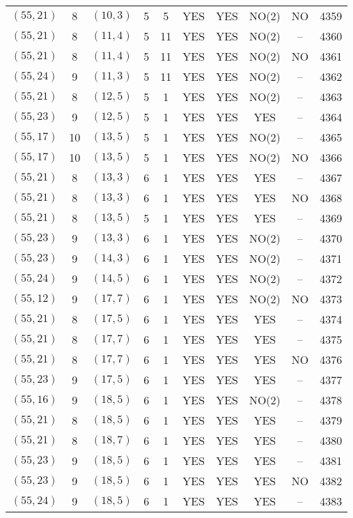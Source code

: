 \begin{longtable}{|c|c|c|c|c|c|c|c|c|c|}
$(55, 21)$ & 8 & $(10, 3)$ & 5 & 5 & YES & YES & NO(2) & NO & 4359\\
$(55, 21)$ & 8 & $(11, 4)$ & 5 & 11 & YES & YES & NO(2) & -- & 4360\\
$(55, 21)$ & 8 & $(11, 4)$ & 5 & 11 & YES & YES & NO(2) & NO & 4361\\
$(55, 24)$ & 9 & $(11, 3)$ & 5 & 11 & YES & YES & NO(2) & -- & 4362\\
$(55, 21)$ & 8 & $(12, 5)$ & 5 & 1 & YES & YES & NO(2) & -- & 4363\\
$(55, 23)$ & 9 & $(12, 5)$ & 5 & 1 & YES & YES & YES & -- & 4364\\
$(55, 17)$ & 10 & $(13, 5)$ & 5 & 1 & YES & YES & NO(2) & -- & 4365\\
$(55, 17)$ & 10 & $(13, 5)$ & 5 & 1 & YES & YES & NO(2) & NO & 4366\\
$(55, 21)$ & 8 & $(13, 3)$ & 6 & 1 & YES & YES & YES & -- & 4367\\
$(55, 21)$ & 8 & $(13, 3)$ & 6 & 1 & YES & YES & YES & NO & 4368\\
$(55, 21)$ & 8 & $(13, 5)$ & 5 & 1 & YES & YES & YES & -- & 4369\\
$(55, 23)$ & 9 & $(13, 3)$ & 6 & 1 & YES & YES & NO(2) & -- & 4370\\
$(55, 23)$ & 9 & $(14, 3)$ & 6 & 1 & YES & YES & NO(2) & -- & 4371\\
$(55, 24)$ & 9 & $(14, 5)$ & 6 & 1 & YES & YES & NO(2) & -- & 4372\\
$(55, 12)$ & 9 & $(17, 7)$ & 6 & 1 & YES & YES & NO(2) & NO & 4373\\
$(55, 21)$ & 8 & $(17, 5)$ & 6 & 1 & YES & YES & YES & -- & 4374\\
$(55, 21)$ & 8 & $(17, 7)$ & 6 & 1 & YES & YES & YES & -- & 4375\\
$(55, 21)$ & 8 & $(17, 7)$ & 6 & 1 & YES & YES & YES & NO & 4376\\
$(55, 23)$ & 9 & $(17, 5)$ & 6 & 1 & YES & YES & YES & -- & 4377\\
$(55, 16)$ & 9 & $(18, 5)$ & 6 & 1 & YES & YES & NO(2) & -- & 4378\\
$(55, 21)$ & 8 & $(18, 5)$ & 6 & 1 & YES & YES & YES & -- & 4379\\
$(55, 21)$ & 8 & $(18, 7)$ & 6 & 1 & YES & YES & YES & -- & 4380\\
$(55, 23)$ & 9 & $(18, 5)$ & 6 & 1 & YES & YES & YES & -- & 4381\\
$(55, 23)$ & 9 & $(18, 5)$ & 6 & 1 & YES & YES & YES & NO & 4382\\
$(55, 24)$ & 9 & $(18, 5)$ & 6 & 1 & YES & YES & YES & -- & 4383\\

\end{longtable}
